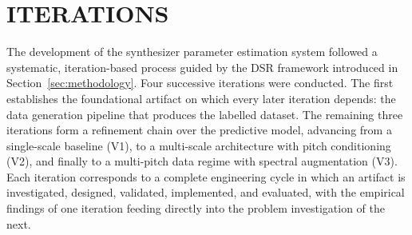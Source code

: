 
\section{ITERATIONS}
\label{sec:iterations}

\noindent
The development of the synthesizer parameter estimation system followed a systematic, iteration-based process guided by the DSR framework introduced in Section~\ref{sec:methodology}. Four successive iterations were conducted. The first establishes the foundational artifact on which every later iteration depends: the data generation pipeline that produces the labelled dataset. The remaining three iterations form a refinement chain over the predictive model, advancing from a single-scale baseline (V1), to a multi-scale architecture with pitch conditioning (V2), and finally to a multi-pitch data regime with spectral augmentation (V3). Each iteration corresponds to a complete engineering cycle in which an artifact is investigated, designed, validated, implemented, and evaluated, with the empirical findings of one iteration feeding directly into the problem investigation of the next.

